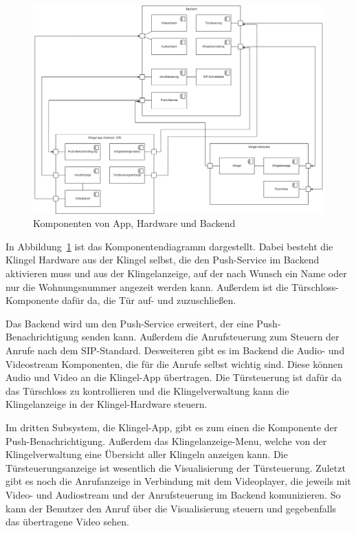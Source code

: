 \begin{figure}[ht!]
    \centering\includegraphics[width=\paperwidth-2in]{../assets/img/Komponentendiagramm}

    \caption{Komponenten von App, Hardware und Backend}
    \label{fig:komponentendiagramm}
\end{figure}
In Abbildung~\ref{fig:komponentendiagramm} ist das Komponentendiagramm dargestellt.
Dabei besteht die Klingel Hardware aus der Klingel selbst, die den Push-Service im Backend aktivieren muss 
und aus der Klingelanzeige, auf der nach Wunsch ein Name oder nur die Wohnungsnummer angezeit werden kann.
Außerdem ist die Türschloss-Komponente dafür da, die Tür auf- und zuzuschließen.

Das Backend wird um den Push-Service erweitert, der eine Push-Benachrichtigung senden kann.
Außerdem die Anrufsteuerung zum Steuern der Anrufe nach dem SIP-Standard.
Desweiteren gibt es im Backend die Audio- und Videostream Komponenten, die für die Anrufe selbst wichtig sind.
Diese können Audio und Video an die Klingel-App übertragen.
Die Türsteuerung ist dafür da das Türschloss zu kontrollieren und die Klingelverwaltung kann die Klingelanzeige in der Klingel-Hardware steuern.

Im dritten Subsystem, die Klingel-App, gibt es zum einen die Komponente der Push-Benachrichtigung.
Außerdem das Klingelanzeige-Menu, welche von der Klingelverwaltung eine Übersicht aller Klingeln anzeigen kann.
Die Türsteuerungsanzeige ist wesentlich die Visualisierung der Türsteuerung.
Zuletzt gibt es noch die Anrufanzeige in Verbindung mit dem Videoplayer, die jeweils mit Video- und Audiostream und der Anrufsteuerung im Backend komunizieren.
So kann der Benutzer den Anruf über die Visualisierung steuern und gegebenfalls das übertragene Video sehen.